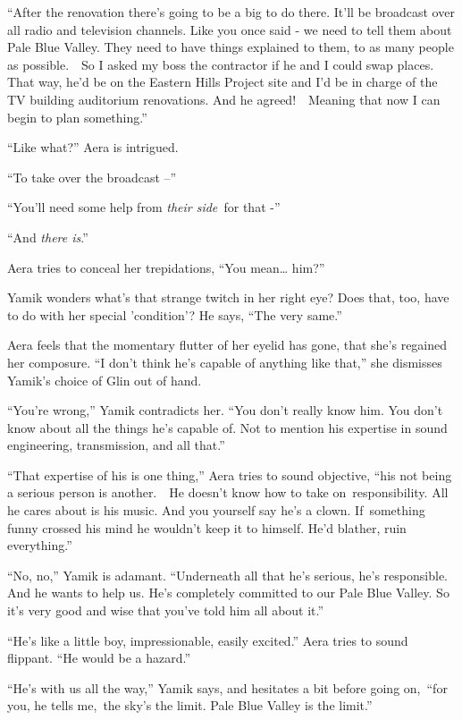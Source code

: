 \documentclass[twoside,11pt]{book}
\begin{document}
``After the renovation there's going to be a big to do there. It'll be broadcast over all radio and
television channels. Like you once said - we need to tell them about Pale Blue Valley. They need to have things
explained to them, to as many people as possible.\ \ So I asked my boss the contractor if he and I could swap places.
That way, he'd be on the Eastern Hills Project site and I'd be in charge of the TV building auditorium renovations. And
he agreed!\ \ Meaning that now I can begin to plan something.'' 

``Like what?'' Aera is intrigued. 

``To take over the broadcast --'' 

``You'll need some help from \textit{their side\ }for that -'' 

``And \textit{there is}.'' 

Aera tries to conceal her trepidations, ``You mean{\dots} him?'' 

Yamik wonders what's that strange twitch in her right eye? Does that, too, have to do with her special 'condition'? He
says, ``The very same.'' 

Aera feels that the momentary flutter of her eyelid has gone, that she's regained her composure. ``I don't
think he's capable of anything like that,'' she dismisses Yamik's choice of Glin out of hand. ~

``You're wrong,'' Yamik contradicts her. ``You don't really know him. You don't
know about all the things he's capable of. Not to mention his expertise in sound engineering, transmission, and all
that.'' 

``That expertise of his is one thing,'' Aera tries to sound objective, ``his not
being a serious person is another.\ \ He doesn't know how to take on~responsibility. All he cares about is his music.
And you yourself say he's a clown. If~something funny crossed his mind he wouldn't keep it to himself. He'd blather,
ruin everything.'' 

``No, no,'' Yamik is adamant. ``Underneath all that he's serious, he's
responsible. And he wants to help us. He's completely committed to our Pale Blue Valley. So it's very good and wise
that you've told him all about it.'' 

``He's like a little boy, impressionable, easily excited.'' Aera tries to sound flippant.
``He would be a hazard.''

``He's with us all the way,'' Yamik says, and hesitates a bit before going
on,{\ }``for you, he tells me,~the sky's the limit. Pale Blue Valley is the limit.''
\end{document}
